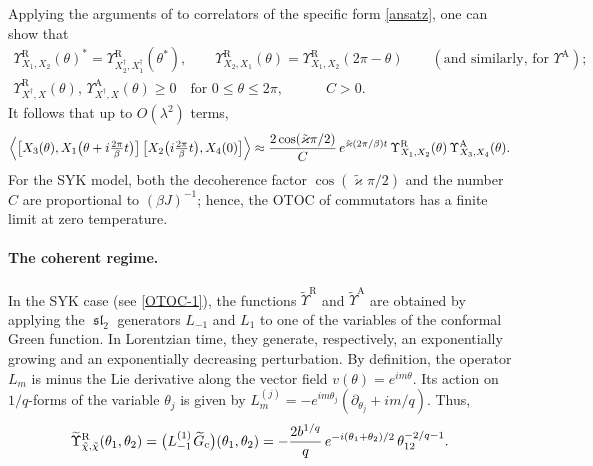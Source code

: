 \documentclass[12pt]{article}
\renewcommand{\le}{\leqslant}
\renewcommand{\ge}{\geqslant}
\newcommand{\kap}{\varkappa}
\DeclareMathOperator{\sL}{\mathfrak{sl}}
\newcommand{\cc}{\mathrm{c}}
\newcommand{\Ret}{\text{R}}
\newcommand{\Adv}{\text{A}}
\newcommand{\tG}{\widetilde{G}}
\newcommand{\tkap}{\tilde{\kap}}
\newcommand{\tUp}{\widetilde{\Upsilon}}
\begin{document}
Applying the arguments of \cite{MSS15} to correlators of the specific form \eqref{ansatz}, one can show that
\begin{gather}
\Upsilon_{X_{1},X_{2}}^{\Ret}(\theta)^*
=\Upsilon_{X_{2}^{\dag},X_{1}^{\dag}}^{\Ret}(\theta^*),\qquad
\Upsilon_{X_{2},X_{1}}^{\Ret}(\theta)
=\Upsilon_{X_{1},X_{2}}^{\Ret}(2\pi-\theta)\qquad
(\text{and similarly, for } \Upsilon^{\Adv});
\\[5pt]
\Upsilon_{X^\dag,X}^{\Ret}(\theta),\,
\Upsilon_{X^\dag,X}^{\Adv}(\theta)\ge 0\quad
\text{for } 0\le\theta\le 2\pi,\qquad\quad C>0.
\end{gather}
It follows that up to $O(\lambda^2)$ terms, 
\begin{equation}
\Bigl\langle
\bigl[X_3(\theta),X_1\bigl(\theta+i\tfrac{2\pi}{\beta}t\bigr)\bigr]\,
\bigl[X_2\bigl(i\tfrac{2\pi}{\beta}t\bigr),X_4(0)\bigr]
\Bigr\rangle
\approx\frac{2\cos(\tkap\pi/2)}{C}\,e^{\tkap(2\pi/\beta)t}\,
\Upsilon_{X_{1},X_{2}}^{\Ret}(\theta)\,
\Upsilon_{X_{3},X_{4}}^{\Adv}(\theta).
\end{equation}
For the SYK model, both the decoherence factor $\cos(\tkap\pi/2)$ and the number $C$ are proportional to $(\beta J)^{-1}$; hence, the OTOC of commutators has a finite limit at zero temperature.

\paragraph{The coherent regime.} In the SYK case (see \eqref{OTOC-1}), the functions $\tUp^{\Ret}$ and $\tUp^{\Adv}$ are obtained by applying the $\sL_2$ generators $L_{-1}$ and $L_{1}$ to one of the variables of the conformal Green function. In Lorentzian time, they generate, respectively, an exponentially growing and an exponentially decreasing perturbation. By definition, the operator $L_{m}$ is minus the Lie derivative along the vector field $v(\theta)=e^{im\theta}$. Its action on $1/q$-forms of the variable $\theta_j$ is given by $L_{m}^{(j)}=-e^{im\theta_j}(\partial_{\theta_j}+im/q)$. Thus,
\begin{equation}
\tUp^{\Ret}_{\tilde{\chi},\tilde{\chi}}(\theta_1,\theta_2)
=\bigl(L_{-1}^{(1)}\kern1pt\tG_{\cc}\bigr)(\theta_1,\theta_2)
=-\frac{2b^{1/q}}{q}\,e^{-i(\theta_1+\theta_2)/2}\,\theta_{12}^{-2/q-1}.
\end{equation}
\end{document}

